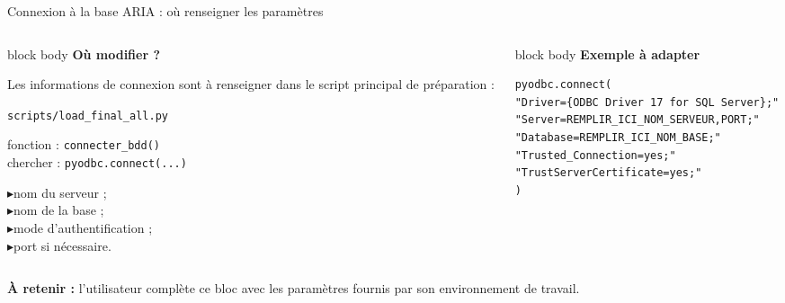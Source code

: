 \documentclass[10pt,aspectratio=169]{beamer}
\newcommand{\smallbullet}{\textcolor{MainBlue}{$\blacktriangleright$}\hspace{0.4em}}
\newenvironment{infobox}[1]
{\begin{beamercolorbox}[rounded=true,shadow=false,wd=\linewidth,sep=0.8em]{block body}
\textbf{\color{DarkBlue}#1}\par\vspace{0.3em}}
{\end{beamercolorbox}}
\begin{document}
\begin{frame}[fragile]{Connexion à la base ARIA : où renseigner les paramètres}
\begin{columns}[T,onlytextwidth]
\begin{column}{0.46\linewidth}
\begin{infobox}{Où modifier ?}
Les informations de connexion sont à renseigner dans le script principal de préparation :

\vspace{0.4em}
\texttt{scripts/load\_final\_all.py}

\vspace{0.4em}
fonction : \texttt{connecter\_bdd()}\\
chercher : \texttt{pyodbc.connect(...)}

\vspace{0.4em}
\smallbullet nom du serveur ;\\
\smallbullet nom de la base ;\\
\smallbullet mode d'authentification ;\\
\smallbullet port si nécessaire.
\end{infobox}
\end{column}

\begin{column}{0.50\linewidth}
\begin{infobox}{Exemple à adapter}
\begin{lstlisting}
pyodbc.connect(
"Driver={ODBC Driver 17 for SQL Server};"
"Server=REMPLIR_ICI_NOM_SERVEUR,PORT;"
"Database=REMPLIR_ICI_NOM_BASE;"
"Trusted_Connection=yes;"
"TrustServerCertificate=yes;"
)
\end{lstlisting}
\end{infobox}
\end{column}
\end{columns}

\vfill
\centering
\textbf{À retenir :} l'utilisateur complète ce bloc avec les paramètres fournis par son environnement de travail.
\end{frame}
\end{document}
